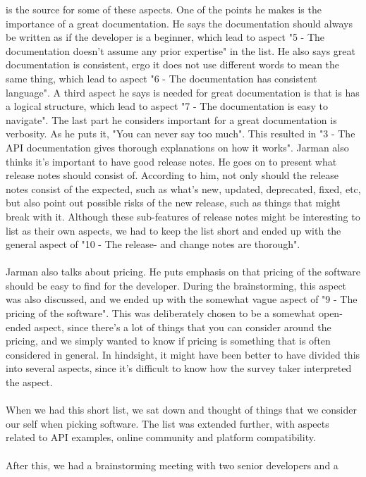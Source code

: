 \documentclass{article}
\begin{document}
\cite{jarman} is the source for some of these
aspects. One of the points he makes is the importance of a great documentation.
He says the documentation should always be written as if the developer is
a beginner, which lead to aspect "5 - The documentation doesn't assume any prior expertise" in the list.
He also says great documentation is consistent, ergo it does not use different
words to mean the same thing, which lead to aspect "6 - The documentation has consistent language".
A third aspect he says is needed for great documentation is that is has a
logical structure, which lead to aspect "7 - The documentation is easy to navigate".
The last part he considers important for a great documentation is verbosity.
As he puts it, "You can never say too much". This resulted in "3 - The API documentation gives thorough explanations on how it works".
Jarman also thinks it's important to have good release notes. He goes on
to present what release notes should consist of. According to him, not
only should the release notes consist of the expected, such as what's new,
updated, deprecated, fixed, etc, but also point out possible risks of the new release,
such as things that might break with it. Although these sub-features of release notes
might be interesting to list as their own aspects, we had to keep the list short
and ended up with the general aspect of "10 - The release- and change notes are thorough".
\\ \\
Jarman also talks about pricing. He puts emphasis on that pricing of the software
should be easy to find for the developer. During the brainstorming, this
aspect was also discussed, and we ended up with the somewhat vague
aspect of "9 - The pricing of the software". This was deliberately chosen
to be a somewhat open-ended aspect, since there's a lot of things that you can
consider around the pricing, and we simply wanted to know if pricing is something
that is often considered in general. In hindsight, it might have been better to have
divided this into several aspects, since it's difficult to know how the
survey taker interpreted the aspect.
\\ \\
When we had this short list, we sat down and thought of things that we
consider our self when picking software. The list was extended further,
with aspects related to API examples, online community and  platform compatibility.
\\ \\
After this, we had a brainstorming meeting with two senior developers and a
\end{document}
